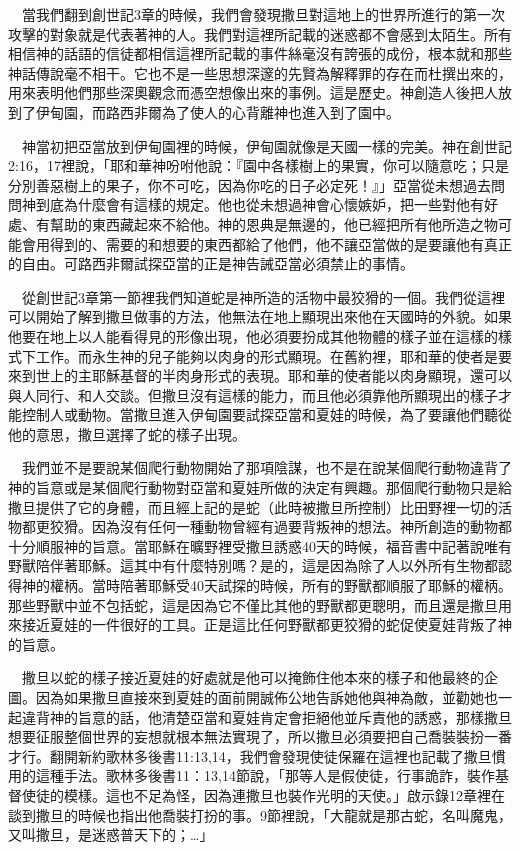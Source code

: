 \documentclass{book}
\begin{document}
　當我們翻到創世記3章的時候，我們會發現撒旦對這地上的世界所進行的第一次攻擊的對象就是代表著神的人。我們對這裡所記載的迷惑都不會感到太陌生。所有相信神的話語的信徒都相信這裡所記載的事件絲毫沒有誇張的成份，根本就和那些神話傳說毫不相干。它也不是一些思想深邃的先賢為解釋罪的存在而杜撰出來的，用來表明他們那些深奧觀念而憑空想像出來的事例。這是歷史。神創造人後把人放到了伊甸園，而路西非爾為了使人的心背離神也進入到了園中。

　神當初把亞當放到伊甸園裡的時候，伊甸園就像是天國一樣的完美。神在創世記2:16，17裡說，「耶和華神吩咐他說：『園中各樣樹上的果實，你可以隨意吃；只是分別善惡樹上的果子，你不可吃，因為你吃的日子必定死！』」亞當從未想過去問問神到底為什麼會有這樣的規定。他也從未想過神會心懷嫉妒，把一些對他有好處、有幫助的東西藏起來不給他。神的恩典是無邊的，他已經把所有他所造之物可能會用得到的、需要的和想要的東西都給了他們，他不讓亞當做的是要讓他有真正的自由。可路西非爾試探亞當的正是神告誡亞當必須禁止的事情。

　從創世記3章第一節裡我們知道蛇是神所造的活物中最狡猾的一個。我們從這裡可以開始了解到撒旦做事的方法，他無法在地上顯現出來他在天國時的外貌。如果他要在地上以人能看得見的形像出現，他必須要扮成其他物體的樣子並在這樣的樣式下工作。而永生神的兒子能夠以肉身的形式顯現。在舊約裡，耶和華的使者是要來到世上的主耶穌基督的半肉身形式的表現。耶和華的使者能以肉身顯現，還可以與人同行、和人交談。但撒旦沒有這樣的能力，而且他必須靠他所顯現出的樣子才能控制人或動物。當撒旦進入伊甸園要試探亞當和夏娃的時候，為了要讓他們聽從他的意思，撒旦選擇了蛇的樣子出現。

　我們並不是要說某個爬行動物開始了那項陰謀，也不是在說某個爬行動物違背了神的旨意或是某個爬行動物對亞當和夏娃所做的決定有興趣。那個爬行動物只是給撒旦提供了它的身體，而且經上記的是蛇（此時被撒旦所控制）比田野裡一切的活物都更狡猾。因為沒有任何一種動物曾經有過要背叛神的想法。神所創造的動物都十分順服神的旨意。當耶穌在曠野裡受撒旦誘惑40天的時候，福音書中記著說唯有野獸陪伴著耶穌。這其中有什麼特別嗎？是的，這是因為除了人以外所有生物都認得神的權柄。當時陪著耶穌受40天試探的時候，所有的野獸都順服了耶穌的權柄。那些野獸中並不包括蛇，這是因為它不僅比其他的野獸都更聰明，而且還是撒旦用來接近夏娃的一件很好的工具。正是這比任何野獸都更狡猾的蛇促使夏娃背叛了神的旨意。

　撒旦以蛇的樣子接近夏娃的好處就是他可以掩飾住他本來的樣子和他最終的企圖。因為如果撒旦直接來到夏娃的面前開誠佈公地告訴她他與神為敵，並勸她也一起違背神的旨意的話，他清楚亞當和夏娃肯定會拒絕他並斥責他的誘惑，那樣撒旦想要征服整個世界的妄想就根本無法實現了，所以撒旦必須要把自己喬裝裝扮一番才行。翻開新約歌林多後書11:13,14，我們會發現使徒保羅在這裡也記載了撒旦慣用的這種手法。歌林多後書11：13,14節說，「那等人是假使徒，行事詭詐，裝作基督使徒的模樣。這也不足為怪，因為連撒旦也裝作光明的天使。」啟示錄12章裡在談到撒旦的時候也指出他喬裝打扮的事。9節裡說，「大龍就是那古蛇，名叫魔鬼，又叫撒旦，是迷惑普天下的；…」
\end{document}
